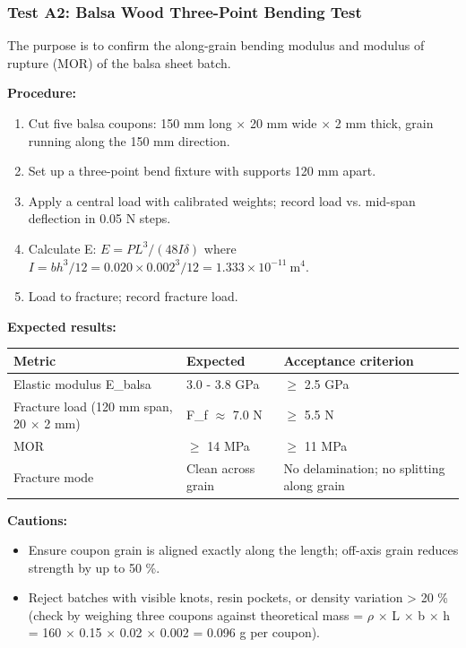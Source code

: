 \documentclass[10pt,a4paper]{article}
\begin{document}
\subsubsection{Test A2: Balsa Wood Three-Point Bending Test}

The purpose is to confirm the along-grain bending modulus and modulus of rupture (MOR) of the balsa sheet batch.

\textbf{Procedure:}
\begin{enumerate}[noitemsep,topsep=2pt]
\item Cut five balsa coupons: 150 mm long ${\times}$ 20 mm wide ${\times}$ 2 mm thick, grain running along the 150 mm direction.
\item Set up a three-point bend fixture with supports 120 mm apart.
\item Apply a central load with calibrated weights; record load vs. mid-span deflection in 0.05 N steps.
\item Calculate E: $E = PL^3/(48I\delta)$ where $I = bh^3/12 = 0.020 \times 0.002^3 / 12 = 1.333 \times 10^{-11}\ \text{m}^4$.
\item Load to fracture; record fracture load.
\end{enumerate}

\textbf{Expected results:}

\begin{center}
\begin{tabular}{|l|l|l|}
\hline
Metric & Expected & Acceptance criterion \\
\hline
Elastic modulus E\_balsa & 3.0 - 3.8 GPa & ${\geq}$ 2.5 GPa \\
\hline
Fracture load (120 mm span, 20 ${\times}$ 2 mm) & F\_f ${\approx}$ 7.0 N & ${\geq}$ 5.5 N \\
\hline
MOR & ${\geq}$ 14 MPa & ${\geq}$ 11 MPa \\
\hline
Fracture mode & Clean across grain & No delamination; no splitting along grain \\
\hline
\end{tabular}
\end{center}

\textbf{Cautions:}
\begin{itemize}[noitemsep,topsep=2pt]
\item Ensure coupon grain is aligned exactly along the length; off-axis grain reduces strength by up to 50 \%.
\item Reject batches with visible knots, resin pockets, or density variation > 20 \% (check by weighing three coupons against theoretical mass = ${\rho}$ ${\times}$ L ${\times}$ b ${\times}$ h = 160 ${\times}$ 0.15 ${\times}$ 0.02 ${\times}$ 0.002 = 0.096 g per coupon).
\end{itemize}
\end{document}
